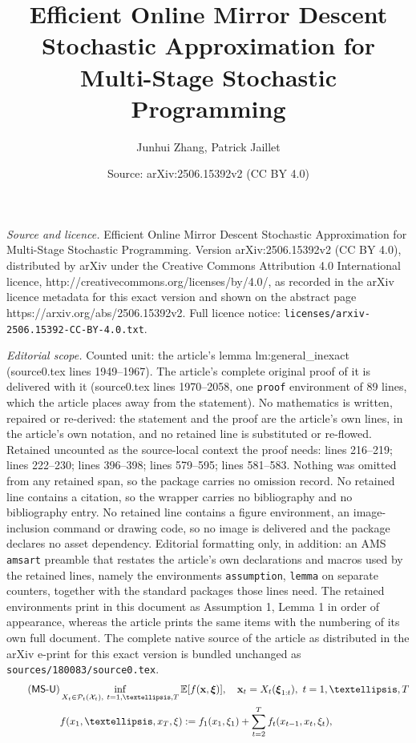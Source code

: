 \documentclass[10pt,a4paper]{amsart}
\title{Efficient Online Mirror Descent Stochastic Approximation for Multi-Stage Stochastic Programming}
\author{Junhui Zhang, Patrick Jaillet}
\date{Source: arXiv:2506.15392v2 (CC BY 4.0)}
\newcommand{\E}{\mathbb{E}}
\newcommand{\bx}{\boldsymbol{\xi}}
\newcommand{\mb}{\mathbf}
\newcommand{\mc}{\mathcal}
\newcommand{\msup}{$\mathsf{MS}$-$\mathsf{U}$}
\begin{document}
\maketitle

\noindent\emph{Source and licence.} Efficient Online Mirror Descent Stochastic Approximation for Multi-Stage Stochastic Programming. Version arXiv:2506.15392v2 (CC BY 4.0), distributed by arXiv under the Creative Commons Attribution 4.0 International licence, http://creativecommons.org/licenses/by/4.0/, as recorded in the arXiv licence metadata for this exact version and shown on the abstract page https://arxiv.org/abs/2506.15392v2. Full licence notice: \texttt{licenses/arxiv-2506.15392-CC-BY-4.0.txt}.\par\smallskip

\noindent\textit{Editorial scope.} Counted unit: the article's lemma lm:general\_inexact (source0.tex lines 1949--1967). The article's complete original proof of it is delivered with it (source0.tex lines 1970--2058, one \texttt{proof} environment of 89 lines, which the article places away from the statement). No mathematics is written, repaired or re-derived: the statement and the proof are the article's own lines, in the article's own notation, and no retained line is substituted or re-flowed.  Retained uncounted as the source-local context the proof needs: lines 216--219; lines 222--230; lines 396--398; lines 579--595; lines 581--583.  Nothing was omitted from any retained span, so the package carries no omission record.  No retained line contains a citation, so the wrapper carries no bibliography and no bibliography entry.  No retained line contains a figure environment, an image-inclusion command or drawing code, so no image is delivered and the package declares no asset dependency.  Editorial formatting only, in addition: an AMS \texttt{amsart} preamble that restates the article's own declarations and macros used by the retained lines, namely the environments \texttt{assumption}, \texttt{lemma} on separate counters, together with the standard packages those lines need.  The retained environments print in this document as Assumption 1, Lemma 1 in order of appearance, whereas the article prints the same items with the numbering of its own full document.  The complete native source of the article as distributed in the arXiv e-print for this exact version is bundled unchanged as \texttt{sources/180083/source0.tex}.
\begin{align}\label{eq:obj_unconstrained-online}\tag{\msup}
   & \inf_{X_t\in \mc P_t(\mc X_t),~t=1,\ldots,T} \E[f(\mb x,\bx)],\quad \mb x_t = X_t(\bx_{1:t}),~t=1,\ldots,T\\
   & f(x_1,\ldots,x_T,\xi):= f_1(x_1,\xi_1) + \sum_{t=2}^T f_{t}(x_{t-1},x_t,\xi_t), \nonumber
\end{align}
\end{document}
